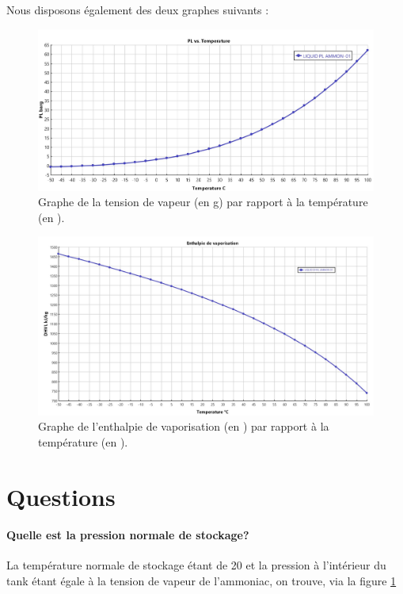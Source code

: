Nous disposons également des deux graphes suivants :

\begin{figure}[htb!]
	\centering
	\includegraphics[scale=0.45]{media/PL_vs_temperature.jpg}
	\caption{Graphe de la tension de vapeur (en \unit{}{\bbar g})
	par rapport à la température (en \unit{}{\degreecelsius}).}
	\label{pvst}
\end{figure}

\begin{figure}[htb!]
	\centering
	\includegraphics[scale=0.49]{media/enthalpie_vap.jpg}
	\caption{Graphe de l'enthalpie de vaporisation 
	(en \unit{}{\kilo\joule\per\kilo\gram}) par rapport à
	la température (en \unit{}{\degreecelsius}).}
	\label{vap}
\end{figure}

\section{Questions}
\paragraph{Quelle est la pression normale de stockage?}
La température normale de stockage étant de \unit{20}{\degreecelsius}
et la pression à l'intérieur du tank étant égale à la tension
de vapeur de l'ammoniac, on trouve, via la figure
\ref{pvst} 

